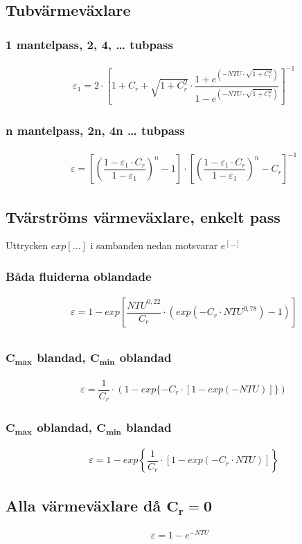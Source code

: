 	\subsection*{Tubvärmeväxlare}
	\subsubsection*{1 mantelpass, 2, 4, … tubpass}
	\begin{align*}
		& \varepsilon_1 = 2 \cdot \left[ 1 + C_r + \sqrt{1+C_r^2} \cdot \dfrac{1+e^{(-NTU \cdot \sqrt{1+C_r^2})}}{1-e^{(-NTU \cdot \sqrt{1+C_r^2})}}\right]^{-1}
	\end{align*}
	\subsubsection*{n mantelpass, 2n, 4n … tubpass}
	\begin{align*}
		& \varepsilon = \left[ \left(\dfrac{1- \varepsilon_1 \cdot C_r}{1 - \varepsilon_1} \right)^n - 1\right] \cdot \left[ \left(\dfrac{1- \varepsilon_1 \cdot C_r}{1 - \varepsilon_1} \right)^n - C_r\right]^{-1}
	\end{align*}
	\subsection*{Tvärströms värmeväxlare, enkelt pass}
	Uttrycken $exp[\dots]$ i sambanden nedan motsvarar $e^{[\dots]}$
	\subsubsection*{Båda fluiderna oblandade}
	\begin{align*}
		& \varepsilon = 1 - exp\left[{\dfrac{NTU^{0,22}}{C_r} \cdot \left(exp{(-C_r \cdot NTU^{0,78})} -1 \right)}\right] \\
	\end{align*}
	\subsubsection*{$\mathbf{C_{max}}$ blandad, $\mathbf{C_{min}}$ oblandad}
	\begin{align*}
	& \varepsilon = \dfrac{1}{C_r} \cdot ( 1- exp\{ -C_r \cdot [1 - exp(-NTU)]\})
	\end{align*}
	\subsubsection*{$\mathbf{C_{max}}$ oblandad, $\mathbf{C_{min}}$ blandad}
	\begin{align*}
	& \varepsilon = 1- exp\left\{ \dfrac{1}{C_r} \cdot [1 - exp(-C_r \cdot NTU)]\right\}
	\end{align*}
	\subsection*{Alla värmeväxlare då $\mathbf{C_r = 0}$}
	\begin{align*}
		\varepsilon = 1 - e^{-NTU}
	\end{align*}

